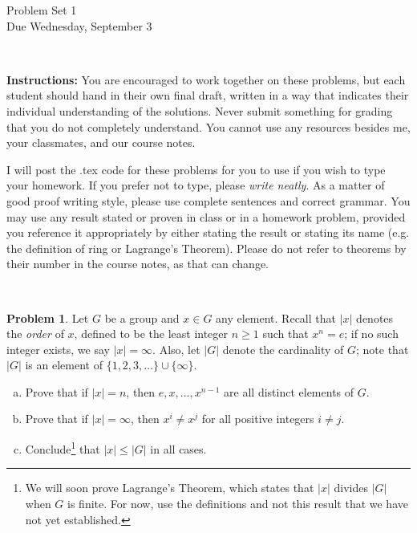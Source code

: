\documentclass[11pt]{article}
\title{}
\date{\vspace{-0.5in}}
\theoremstyle{definition}
\newtheorem{problem}{Problem}
\begin{document}
\thispagestyle{fancy}
\pagestyle{fancy}

\vspace{3em}

\begin{center}
	{\LARGE Problem Set 1 \\}
	Due Wednesday, September 3
\end{center}

\

\noindent
{\bf Instructions:}
You are encouraged to work together on these problems, but each student should hand in their own final draft, written in a way that indicates their individual understanding of the solutions. Never submit something for grading that you do not completely understand. You cannot use any resources besides me, your classmates, and our course notes.


I will post the .tex code for these problems for you to use if you wish to type your homework. If you prefer not to type, please  {\em write neatly}. As a matter of good proof writing style, please use complete sentences and correct grammar. You may use any result stated or proven in class or in a homework problem, provided you reference it appropriately by either stating the result or stating its name (e.g. the definition of ring or Lagrange's Theorem). Please do not refer to theorems by their number in the course notes, as that can change.


\

\begin{problem}
Let $G$ be a group and $x \in G$ any element. 
Recall that $|x|$ denotes the {\em order} of $x$, defined to be the least integer $n \geqslant 1$ such that $x^n = e$; if no such integer exists, we say $|x| = \infty$.
Also, let $|G|$ denote the cardinality of $G$; note that $|G|$ is an element of $\{1, 2, 3, \ldots \} \cup \{\infty\}$.

\begin{enumerate}[(a)]

\item Prove that if $|x| = n$, then $e, x, \dots, x^{n-1}$ are all distinct elements of $G$.

\item Prove that if $|x| = \infty$, then $x^i \neq x^j$ for all positive integers $i \neq j$. 

\item Conclude\footnote{We will soon prove Lagrange's Theorem, which states that $|x|$ divides $|G|$ when $G$ is finite. For now, use the definitions and not this result that we have not yet established.} that $|x| \leqslant |G|$ in all cases. 
\end{enumerate}
\end{problem} 
\end{document}
